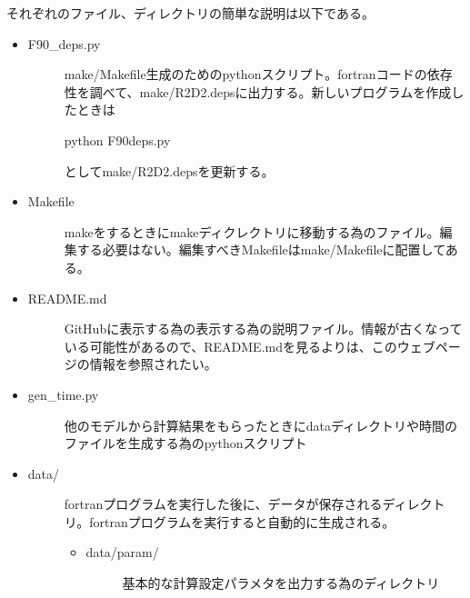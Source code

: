 \documentclass[letterpaper,10pt,dvipdfmx,report]{sphinxmanual}
\begin{document}
それぞれのファイル、ディレクトリの簡単な説明は以下である。
\begin{itemize}
\item {} \begin{description}
\item[{F90\_deps.py}] \leavevmode
make/Makefile生成のためのpythonスクリプト。fortranコードの依存性を調べて、make/R2D2.depsに出力する。新しいプログラムを作成したときは

\begin{sphinxVerbatim}[commandchars=\\\{\}]
python F90\PYGZus{}deps.py
\end{sphinxVerbatim}

としてmake/R2D2.depsを更新する。

\end{description}

\item {} \begin{description}
\item[{Makefile}] \leavevmode
makeをするときにmakeディクレクトリに移動する為のファイル。編集する必要はない。編集すべきMakefileはmake/Makefileに配置してある。

\end{description}

\item {} \begin{description}
\item[{README.md}] \leavevmode
GitHubに表示する為の表示する為の説明ファイル。情報が古くなっている可能性があるので、README.mdを見るよりは、このウェブページの情報を参照されたい。

\end{description}

\item {} \begin{description}
\item[{gen\_time.py}] \leavevmode
他のモデルから計算結果をもらったときにdataディレクトリや時間のファイルを生成する為のpythonスクリプト

\end{description}

\item {} \begin{description}
\item[{data/}] \leavevmode
fortranプログラムを実行した後に、データが保存されるディレクトリ。fortranプログラムを実行すると自動的に生成される。
\begin{itemize}
\item {} \begin{description}
\item[{data/param/}] \leavevmode
基本的な計算設定パラメタを出力する為のディレクトリ


\end{description}
\end{itemize}
\end{description}
\end{itemize}
\end{document}
